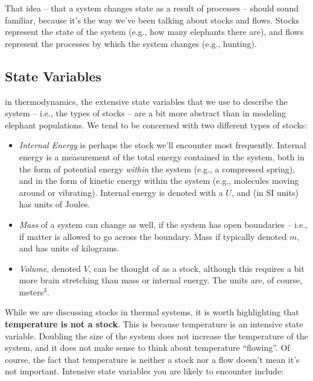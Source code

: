 \documentclass[10pt]{book}
\begin{document}
That idea -- that a system changes state as a result of processes -- should sound familiar, because it's the way we've been talking about stocks and flows.  Stocks represent the state of the system (e.g., how many elephants there are), and flows represent the processes by which the system changes (e.g., hunting).  

\subsection{State Variables}

in thermodynamics, the extensive state variables that we use to describe the system -- i.e., the types of stocks -- are a bit more abstract than in modeling elephant populations.  We tend to be concerned with two different types of stocks:

\begin{itemize}
\item {\it Internal Energy} is perhaps the stock we'll encounter most frequently.  Internal energy is a measurement of the total energy contained in the system, both in the form of potential energy {\it within} the system (e.g., a compressed spring), and in the form of kinetic energy within the system (e.g., molecules moving around or vibrating).  Internal energy is denoted with a $U$, and (in SI units) has units of Joules.

\item {\it Mass} of a system can change as well, if the system has open boundaries -- i.e., if matter is allowed to go across the boundary.  Mass if typically denoted $m$, and has units of kilograms.

\item{\it Volume}, denoted $V$, can be thought of as a stock, although this requires a bit more brain stretching than mass or internal energy.  The units are, of course, meters$^3$.

\end{itemize}

While we are discussing stocks in thermal systems, it is worth highlighting that {\bf temperature is not a stock}.  This is because temperature is an intensive state variable.  Doubling the size of the system does not increase the temperature of the system, and it does not make sense to think about temperature ``flowing''.  Of course, the fact that temperature is neither a stock nor a flow doesn't mean it's not important.  Intensive state variables you are likely to encounter include:
\end{document}
